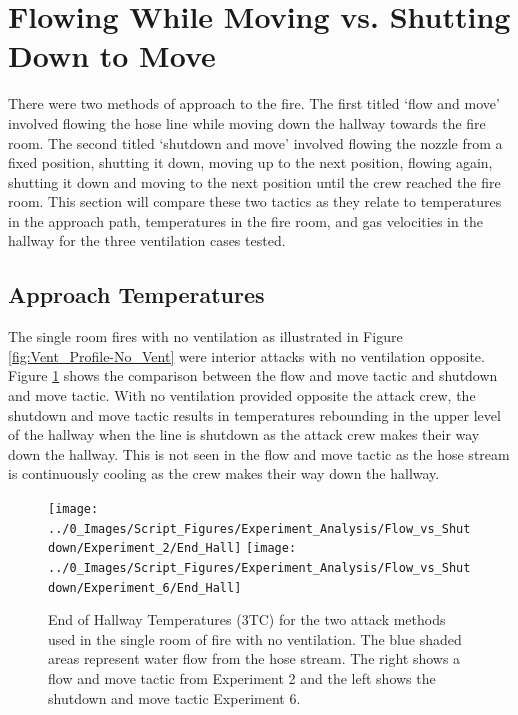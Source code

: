 \documentclass[12pt,oneside]{book}
\begin{document}
\section{Flowing While Moving vs. Shutting Down to Move}
There were two methods of approach to the fire. The first titled `flow and move' involved flowing the hose line while moving down the hallway towards the fire room. The second titled `shutdown and move' involved flowing the nozzle from a fixed position, shutting it down, moving up to the next position, flowing again, shutting it down and moving to the next position until the crew reached the fire room. This section will compare these two tactics as they relate to temperatures in the approach path, temperatures in the fire room, and gas velocities in the hallway for the three ventilation cases tested. 

\subsection{Approach Temperatures}

The single room fires with no ventilation as illustrated in Figure \ref{fig:Vent_Profile-No_Vent} were interior attacks with no ventilation opposite. Figure \ref{fig:Flow_vs_Shut_Single_No_Vent} shows the comparison between the flow and move tactic and shutdown and move tactic. With no ventilation provided opposite the attack crew, the shutdown and move tactic results in temperatures rebounding in the upper level of the hallway when the line is shutdown as the attack crew makes their way down the hallway. This is not seen in the flow and move tactic as the hose stream is continuously cooling as the crew makes their way down the hallway. 

\begin{figure}[H]
\centering
\texttt{[image: ../0\_Images/Script\_Figures/Experiment\_Analysis/Flow\_vs\_Shutdown/Experiment\_2/End\_Hall]}
\texttt{[image: ../0\_Images/Script\_Figures/Experiment\_Analysis/Flow\_vs\_Shutdown/Experiment\_6/End\_Hall]}
\caption[Single Room - No Vent - Flow \& Move vs. Shutdown \& Move - Hall Temperature]{End of Hallway Temperatures (3TC) for the two attack methods used in the single room of fire with no ventilation. The blue shaded areas represent water flow from the hose stream. The right shows a flow and move tactic from Experiment 2 and the left shows the shutdown and move tactic Experiment 6.}
\label{fig:Flow_vs_Shut_Single_No_Vent}
\end{figure}
\end{document}
